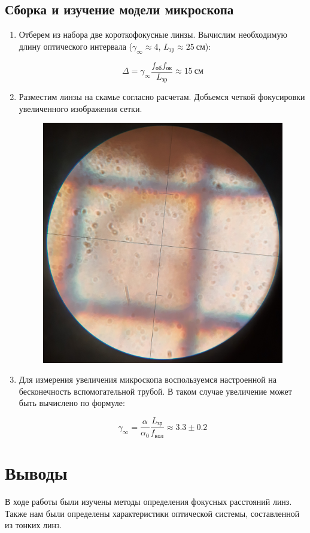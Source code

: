 \documentclass[14pt, a4paper]{report}
\begin{document}
\subsection{Сборка и изучение модели микроскопа}

\begin{enumerate}

\item Отберем из набора две короткофокусные линзы. Вычислим необходимую длину оптического интервала ($\gamma_\infty\approx4$, $L_{зр}\approx25\ см$):

\[\Delta=\gamma_\infty\frac{f_{об}f_{ок}}{L_{зр}}\approx15\ см\]

\item Разместим линзы на скамье согласно расчетам. Добьемся четкой фокусировки увеличенного изображения сетки.

\begin{figure}[H]
\centering
\includegraphics[width=.6\linewidth]{../images/411_3}
\end{figure}

\item Для измерения увеличения микроскопа воспользуемся настроенной на бесконечность вспомогательной трубой. В таком случае увеличение может быть вычислено по формуле:

\[\gamma_\infty=\frac{\alpha}{\alpha_0}\frac{L_{зр}}{f_{кол}}\approx3.3\pm0.2\]

\end{enumerate}

\section{Выводы}

В ходе работы были изучены методы определения фокусных расстояний линз. Также нам были определены характеристики оптической системы, составленной из тонких линз.
\end{document}
